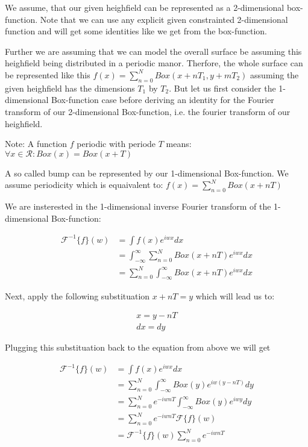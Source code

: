 We assume, that our given heighfield can be represented as a 2-dimensional box-function. 
Note that we can use any explicit given constrainted 2-dimensional function and will get some identities like
we get from the box-function.
 
Further we are assuming that we can model the overall surface be assuming this heighfield being distributed in a periodic manor.
Therfore, the whole surface can be represented like this $f(x) = \sum_{n=0}^{N} Box(x+nT_1, y+mT_2)$ assuming the given heighfield has the dimensions $T_1$ by $T_2$. But let us first consider the 1-dimensional Box-function case before deriving an identity for the Fourier transform of our 2-dimensional Box-function, i.e. the fourier transform of our heighfield. 

Note: A function $f$ periodic with periode $T$ means: $\forall x \in \mathcal{R}: Box(x) = Box(x+T)$

A so called bump can be represented by our 1-dimensional Box-function. We assume periodicity which is equaivalent to:   
$f(x) = \sum_{n=0}^{N} Box(x+nT)$

We are insterested in the 1-dimensional inverse Fourier transform of the 1-dimensional Box-function:

\begin{align*}
\mathcal{F}^{-1}\{f\}(w)
& =\int f(x) e^{iwx}dx\\
& =\int_{-\infty}^{\infty} \sum_{n=0}^{N} Box(x+nT) e^{iwx}dx\\
& =\sum_{n=0}^{N} \int_{-\infty}^{\infty} Box(x+nT) e^{iwx}dx
\end{align*}

Next, apply the following substituation $x+nT = y$ which will lead us to:

\begin{gather*}
x=y-nT\\
dx=dy
\end{gather*} 

Plugging this substituation back to the equation from above we will get 

\begin{align*}
\mathcal{F}^{-1}\{f\}(w)
& =\int f(x) e^{iwx}dx\\
& =\sum_{n=0}^{N} \int_{-\infty}^{\infty} Box(y) e^{iw(y-nT)}dy \\
& =\sum_{n=0}^{N} e^{-iwnT} \int_{-\infty}^{\infty} Box(y) e^{iwy}dy \\
& =\sum_{n=0}^{N} e^{-iwnT} \mathcal{F}\{f\}(w) \\
& =\mathcal{F}^{-1}\{f\}(w) \sum_{n=0}^{N} e^{-iwnT}  
\end{align*}

